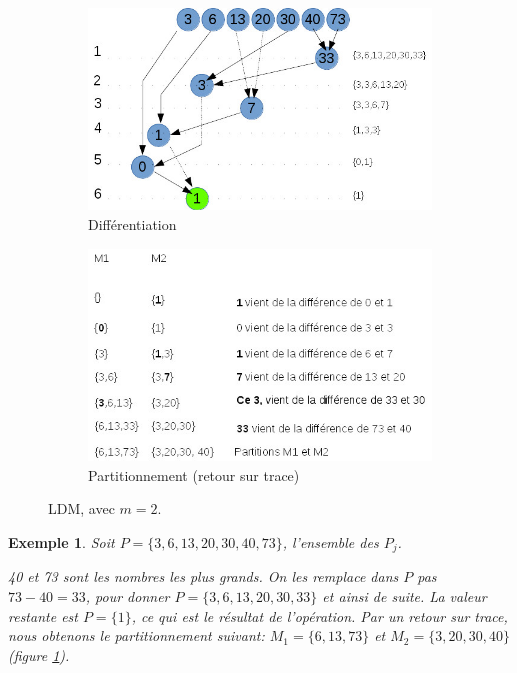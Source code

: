 \documentclass[a4paper,12pt]{report}
\theoremstyle{plain}				%
\newtheorem{example}{Exemple}
\theoremstyle{definition}				%
\begin{document}
\begin{itemize}
\begin{figure}
{\centering}
	\begin{subfigure}[b]{0.45\linewidth}
    \includegraphics[width=\linewidth]
    {Biblio_PCmax_Rendu_exLDM_1_2m.jpg}
    \caption{Différentiation}
  	\end{subfigure}
\hfill%
	\begin{subfigure}[b]{0.45\linewidth}
    \includegraphics[width=\linewidth]
    {Biblio_PCmax_Rendu_exLDM_2_2m.jpg}
    \caption{Partitionnement (retour sur trace)}
  	\end{subfigure}
  	\caption{LDM, avec $m=2$.}
  	\label{fig:LDM2M}
\end{figure}

\begin{example}
Soit $P=\{3,6,13,20,30,40,73\}$, l'ensemble des $P_j$.

40 et 73 sont les nombres les plus grands. On les remplace dans $P$ pas $73 - 40 = 33$, pour donner $P=\{3,6,13,20,30,33\}$ et ainsi de suite.
La valeur restante est $P= \{1\}$, ce qui est le résultat de l'opération.
Par un retour sur trace, nous obtenons le partitionnement suivant:
$M_1 = \{ 6,13,73 \}$ et  $M_2 = \{ 3,20,30,40 \}$ (figure \ref{fig:LDM2M}).


\end{example}
\end{itemize}
\end{document}
